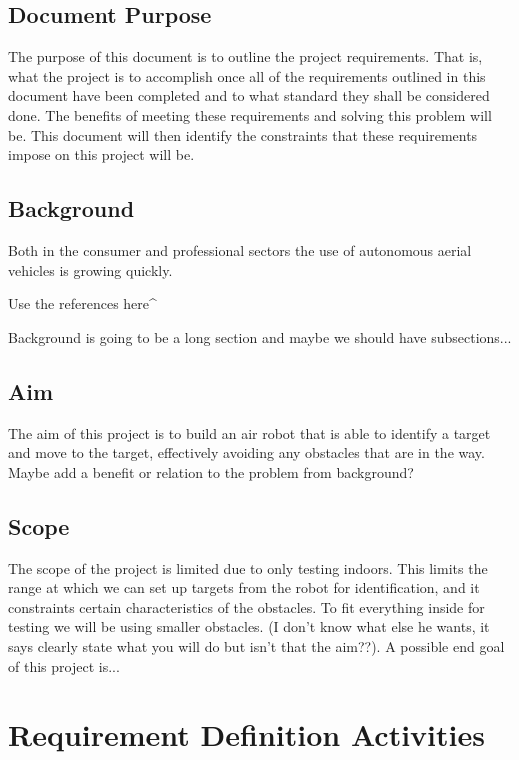 \documentclass[]{report}
\begin{document}
\section{Document Purpose}

The purpose of this document is to outline the project requirements. That is, what the project is to accomplish once all of the requirements outlined in this document have been completed and to what standard they shall be considered done. The benefits of meeting these requirements and solving this problem will be. This document will then identify the constraints that these requirements impose on this project will be.

\section{Background}

Both in the consumer and professional sectors the use of autonomous aerial vehicles is growing quickly. 

Use the references here^

Background is going to be a long section and maybe we should have subsections... 

\section{Aim}

The aim of this project is to build an air robot that is able to identify a target and move to the target, effectively avoiding any obstacles that are in the way. 
Maybe add a benefit or relation to the problem from background?

\section{Scope}
The scope of the project is limited due to only testing indoors. This limits the range at which we can set up targets from the robot for identification, and it constraints certain characteristics of the obstacles. To fit everything inside for testing we will be using smaller obstacles. 
(I don't know what else he wants, it says clearly state what you will do but isn't that the aim??).
A possible end goal of this project is...  
 

\chapter{Requirement Definition Activities}
\end{document}
